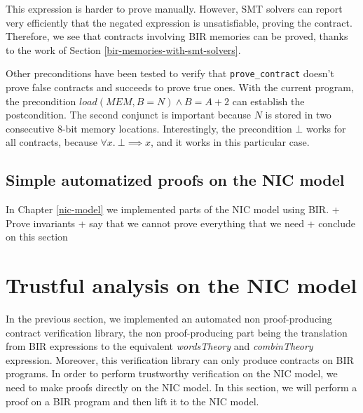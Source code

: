 \documentclass{kththesis}
\begin{document}
This expression is harder to prove manually. However, SMT solvers can report very efficiently that the negated expression is unsatisfiable, proving the contract. Therefore, we see that contracts involving BIR memories can be proved, thanks to the work of Section \ref{bir-memories-with-smt-solvers}.

Other preconditions have been tested to verify that \texttt{prove\_contract} doesn't prove false contracts and succeeds to prove true ones. With the current program, the precondition $load(MEM,B=N) \land B=A+2$ can establish the postcondition. The second conjunct is important because $N$ is stored in two consecutive 8-bit memory locations. Interestingly, the precondition $\bot$ works for all contracts, because $\forall x.~\bot \implies x$, and it works in this particular case.


\subsection{Simple automatized proofs on the NIC model}

In Chapter \ref{nic-model} we implemented parts of the NIC model using BIR.
+ Prove invariants
+ say that we cannot prove everything that we need
+ conclude on this section

\section{Trustful analysis on the NIC model} \label{trustful-nic-analysis}


In the previous section, we implemented an automated non proof-producing contract verification library, the non proof-producing part being the translation from BIR expressions to the equivalent \textit{wordsTheory} and \textit{combinTheory} expression. Moreover, this verification library can only produce contracts on BIR programs. In order to perform trustworthy verification on the \gls{NIC} model, we need to make proofs directly on the \gls{NIC} model. In this section, we will perform a proof on a BIR program and then lift it to the \gls{NIC} model.
\end{document}
